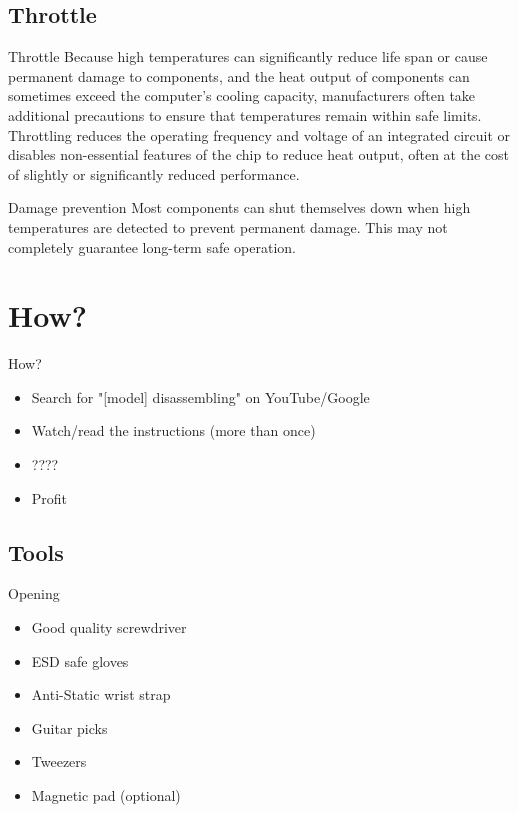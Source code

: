 \documentclass{beamer}
\begin{document}
\subsection{Throttle}
\begin{frame}{Throttle}
    Because high temperatures can significantly reduce life span or cause permanent damage to components, and the heat output of components can sometimes exceed the computer's cooling capacity, manufacturers often take additional precautions to ensure that temperatures remain within safe limits.
    \newline
    \newline
    Throttling reduces the operating frequency and voltage of an integrated circuit or disables non-essential features of the chip to reduce heat output, often at the cost of slightly or significantly reduced performance.
\end{frame}

\begin{frame}{Damage prevention}
    Most components can shut themselves down when high temperatures are detected to prevent permanent damage.
    \newline
    \newline
    This may not completely guarantee long-term safe operation.
\end{frame}

\section{How?}

\begin{frame}{How?}
    \begin{itemize}
        \item Search for "[model] disassembling" on YouTube/Google
        \item Watch/read the instructions (more than once)
        \item ????
        \item Profit
    \end{itemize}
\end{frame}

\subsection{Tools}

\begin{frame}{Opening}
    \begin{itemize}
        \item Good quality screwdriver
        \item ESD safe gloves
        \item Anti-Static wrist strap
        \item Guitar picks
        \item Tweezers
        \item Magnetic pad (optional)
    \end{itemize}
\end{frame}
\end{document}
